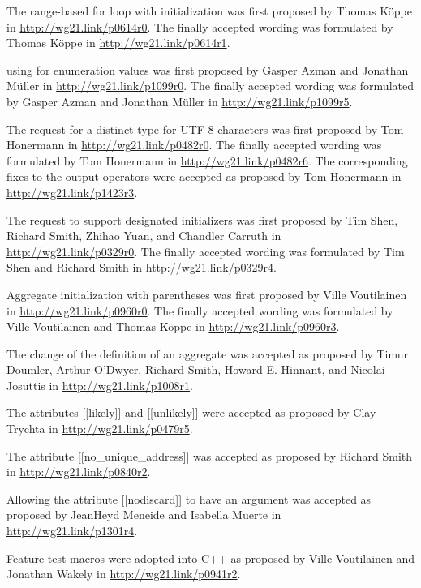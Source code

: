 The range-based for loop with initialization was first proposed by Thomas K{\"o}ppe in \url{http://wg21.link/p0614r0}. The finally accepted wording was formulated by Thomas K{\"o}ppe in \url{http://wg21.link/p0614r1}.

using for enumeration values was first proposed by Gasper Azman and Jonathan M{\"u}ller in \url{http://wg21.link/p1099r0}. The finally accepted wording was formulated by Gasper Azman and Jonathan M{\"u}ller in \url{http://wg21.link/p1099r5}.

The request for a distinct type for UTF-8 characters was first proposed by Tom Honermann in \url{http://wg21.link/p0482r0}. The finally accepted wording was formulated by Tom Honermann in \url{http://wg21.link/p0482r6}. The corresponding fixes to the output operators were accepted as proposed by Tom Honermann in \url{http://wg21.link/p1423r3}.

The request to support designated initializers was first proposed by Tim Shen, Richard Smith, Zhihao Yuan, and Chandler Carruth in \url{http://wg21.link/p0329r0}. The finally accepted wording was formulated by Tim Shen and Richard Smith in \url{http://wg21.link/p0329r4}.

Aggregate initialization with parentheses was first proposed by Ville Voutilainen in \url{http://wg21.link/p0960r0}. The finally accepted wording was formulated by Ville Voutilainen and Thomas K{\"o}ppe in \url{http://wg21.link/p0960r3}.

The change of the definition of an aggregate was accepted as proposed by Timur Doumler, Arthur O’Dwyer, Richard Smith, Howard E. Hinnant, and Nicolai Josuttis in \url{http://wg21.link/p1008r1}.

The attributes [[likely]] and [[unlikely]] were accepted as proposed by Clay Trychta in \url{http://wg21.link/p0479r5}.

The attribute [[no\_unique\_address]] was accepted as proposed by Richard Smith in \url{http://wg21.link/p0840r2}.

Allowing the attribute [[nodiscard]] to have an argument was accepted as proposed by JeanHeyd Meneide and Isabella Muerte in \url{http://wg21.link/p1301r4}.

Feature test macros were adopted into C++ as proposed by Ville Voutilainen and Jonathan Wakely in \url{http://wg21.link/p0941r2}.





